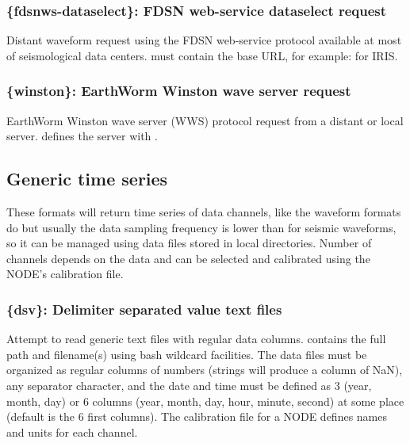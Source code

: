 \subsubsection{\{fdsnws-dataselect\}: FDSN web-service dataselect request}

Distant waveform request using the FDSN web-service protocol available at most of seismological data centers.  must contain the base URL, for example:  for IRIS.

\subsubsection{\{winston\}: EarthWorm Winston wave server request}

EarthWorm Winston wave server (WWS) protocol request from a distant or local server.  defines the server with .


\subsection{Generic time series}
\label{timeseries}

These formats will return time series of data channels, like the waveform formats do but usually the data sampling frequency is lower than for seismic waveforms, so it can be managed using data files stored in local directories. Number of channels depends on the data and can be selected and calibrated using the NODE's calibration file.

\subsubsection{\{dsv\}: Delimiter separated value text files}

Attempt to read generic text files with regular data columns.  contains the full path and filename(s) using bash wildcard facilities. The data files must be organized as regular columns of numbers (strings will produce a column of NaN), any separator character, and the date and time must be defined as 3 (year, month, day) or 6 columns (year, month, day, hour, minute, second) at some place (default is the 6 first columns). The calibration file for a NODE defines names and units for each channel.

